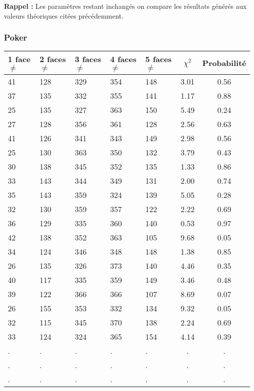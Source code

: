 \documentclass[12pt,a4paper]{article}
\begin{document}
\textbf{Rappel :} Les paramètres restant inchangés on compare les résultats générés aux valeurs théoriques citées précédemment.
\subsubsection{Poker}

\begin{center}
\begin{tabular}{|l|l|l|l|l|c|c|}
\hline
1 face $\neq$ & 2 faces $\neq$  & 3 faces $\neq$ & 4 faces $\neq$ & 5 faces $\neq$ & $\chi^2$ & Probabilité \\
\hline \hline
41 & 128 & 329 & 354 & 148 &  3.01 &  0.56\\ \hline
37 & 135 & 332 & 355 & 141 &  1.17 &  0.88\\ \hline
25 & 135 & 327 & 363 & 150 &  5.49 &  0.24\\ \hline
27 & 128 & 356 & 361 & 128 &  2.56 &  0.63\\ \hline
41 & 126 & 341 & 343 & 149 &  2.98 &  0.56\\ \hline
25 & 130 & 363 & 350 & 132 &  3.79 &  0.43\\ \hline
30 & 138 & 345 & 352 & 135 &  1.33 &  0.86\\ \hline
33 & 143 & 344 & 349 & 131 &  2.00 &  0.74\\ \hline
35 & 143 & 359 & 324 & 139 &  5.05 &  0.28\\ \hline
32 & 130 & 359 & 357 & 122 &  2.22 &  0.69\\ \hline
36 & 129 & 335 & 360 & 140 &  0.53 &  0.97\\ \hline
42 & 138 & 352 & 363 & 105 &  9.68 &  0.05\\ \hline
34 & 124 & 346 & 348 & 148 &  1.38 &  0.85\\ \hline
26 & 135 & 326 & 373 & 140 &  4.46 &  0.35\\ \hline
40 & 117 & 335 & 359 & 149 &  3.46 &  0.48\\ \hline
39 & 122 & 366 & 366 & 107 &  8.69 &  0.07\\ \hline
26 & 155 & 353 & 332 & 134 &  9.32 &  0.05\\ \hline
32 & 115 & 345 & 370 & 138 &  2.24 &  0.69\\ \hline
33 & 124 & 324 & 365 & 154 &  4.14 &  0.39\\ \hline
 . & . & . & . & . & . & . \\ \hline
 . & . & . & . & . & . & . \\ \hline
 . & . & . & . & . & . & . \\ \hline

\end{tabular}
\end{center}
\end{document}
